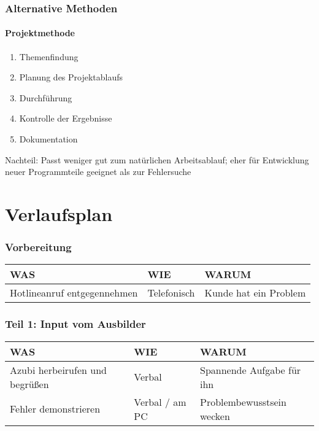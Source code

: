 \documentclass{beamer}
\begin{document}
\setcounter{subsection}{1}
\begin{frame}
  \frametitle{Alternative Methoden}
    \framesubtitle{Projektmethode}
   
    \begin{enumerate}
      \item{Themenfindung}
      \item{Planung des Projektablaufs}
      \item{Durchführung}
      \item{Kontrolle der Ergebnisse}  
      \item{Dokumentation}
    \end{enumerate}        
    
      Nachteil: Passt weniger gut zum natürlichen Arbeitsablauf; eher für Entwicklung neuer Programmteile geeignet als zur Fehlersuche
\end{frame}

\section{Verlaufsplan}

\setcounter{subsection}{1}
\begin{frame}
  \frametitle{Vorbereitung}
  
        \begin{tabular}{|p{3.3cm}|p{3.3cm}|p{3.3cm}|}
        \hline
        WAS & WIE & WARUM \\ \hline
        Hotlineanruf \mbox{entgegennehmen} & Telefonisch & Kunde hat ein \mbox{Problem} \\ \hline
       \end{tabular}  
            
\end{frame}

\setcounter{subsection}{1}
\begin{frame}
  \frametitle{Teil 1: Input vom Ausbilder}
  
        \begin{tabular}{|p{3.3cm}|p{3.3cm}|p{3.3cm}|}
        \hline
        WAS & WIE & WARUM \\ \hline
        Azubi herbeirufen und begrüßen & Verbal & Spannende Aufgabe für ihn \\ \hline
        Fehler demonstrieren & Verbal / am PC & Problembewusstsein wecken \\ \hline
       \end{tabular}

\end{frame}
\end{document}

